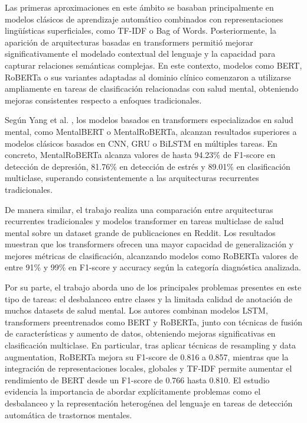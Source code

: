 Las primeras aproximaciones en este ámbito se basaban principalmente en modelos clásicos de aprendizaje automático combinados con representaciones lingüísticas superficiales, como TF-IDF o Bag of Words. Posteriormente, la aparición de arquitecturas basadas en transformers permitió mejorar significativamente el modelado contextual del lenguaje y la capacidad para capturar relaciones semánticas complejas. En este contexto, modelos como BERT, RoBERTa o sus variantes adaptadas al dominio clínico comenzaron a utilizarse ampliamente en tareas de clasificación relacionadas con salud mental, obteniendo mejoras consistentes respecto a enfoques tradicionales.

Según Yang et al. \cite{yang_towards_2023}, los modelos basados en transformers especializados en salud mental, como MentalBERT o MentalRoBERTa, alcanzan resultados superiores a modelos clásicos basados en CNN, GRU o BiLSTM en múltiples tareas. En concreto, MentalRoBERTa alcanza valores de hasta 94.23\% de F1-score en detección de depresión, 81.76\% en detección de estrés y 89.01\% en clasificación multiclase, superando consistentemente a las arquitecturas recurrentes tradicionales.

De manera similar, el trabajo \cite{hasan_mental_2025} realiza una comparación entre arquitecturas recurrentes tradicionales y modelos transformer en tareas multiclase de salud mental sobre un dataset grande de publicaciones en Reddit. Los resultados muestran que los transformers ofrecen una mayor capacidad de generalización y mejores métricas de clasificación, alcanzando modelos como RoBERTa valores de entre 91\% y 99\% en F1-score y accuracy según la categoría diagnóstica analizada.

Por su parte, el trabajo \cite{yang_advancing_2025} aborda uno de los principales problemas presentes en este tipo de tareas: el desbalanceo entre clases y la limitada calidad de anotación de muchos datasets de salud mental. Los autores combinan modelos LSTM, transformers preentrenados como BERT y RoBERTa, junto con técnicas de fusión de características y aumento de datos, obteniendo mejoras significativas en clasificación multiclase. En particular, tras aplicar técnicas de resampling y data augmentation, RoBERTa mejora su F1-score de 0.816 a 0.857, mientras que la integración de representaciones locales, globales y TF-IDF permite aumentar el rendimiento de BERT desde un F1-score de 0.766 hasta 0.810. El estudio evidencia la importancia de abordar explícitamente problemas como el desbalanceo y la representación heterogénea del lenguaje en tareas de detección automática de trastornos mentales.


